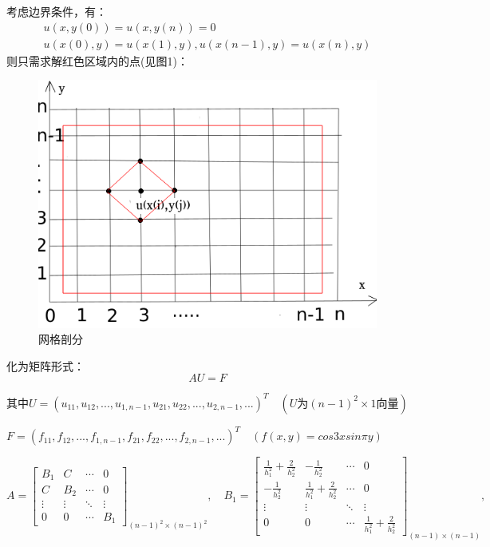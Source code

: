 \documentclass[12pt,a4paper]{article}
\begin{document}
考虑边界条件，有：
\begin{equation}
\begin{array}{l}{u(x,y(0)) = u(x,y(n))=0}\\
{u(x(0),y) = u(x(1),y),u(x(n-1),y) = u(x(n),y)}\end{array}
\end{equation}
\newpage 
则只需求解红色区域内的点(见图1)：
\begin{figure}[ht]
	\centering
	\includegraphics[scale=0.4]{./figures/zuobiao.png}
	\caption{网格剖分}
	\label{fig:label}	
\end{figure}



化为矩阵形式：
$$AU = F$$

其中$U = (u_{11},u_{12},...,u_{1,n-1},u_{21},u_{22},...,u_{2,n-1},...)^{T} \quad (U\text{为}(n-1)^2 \times 1 \text{向量})$

$F = (f_{11},f_{12},...,f_{1,n-1},f_{21},f_{22},...,f_{2,n-1},...)^{T} \quad (f(x,y)=cos{3x}sin{\pi y})$

\begin{equation}
A = \left[                 
\begin{array}{cccc}
B_1& C &\cdots  & 0\\
C& B_2 &\cdots& 0\\
\vdots  & \vdots & \ddots & \vdots \\
0& 0 &\cdots  &B_1
\end{array}
\right ]_{(n-1)^2 \times (n-1)^2},\quad B_1 = \left[                 
\begin{array}{cccc}
\frac{1}{h_1^2}+\frac{2}{h_2^2}& -\frac{1}{h_2^2} &\cdots  & 0\\
-\frac{1}{h_2^2}& \frac{1}{h_1^2}+\frac{2}{h_2^2} &\cdots& 0\\
\vdots  & \vdots & \ddots & \vdots \\
0& 0 &\cdots  &\frac{1}{h_1^2}+\frac{2}{h_2^2}
\end{array}
\right ]_{(n-1) \times (n-1)} ,
\end{equation}
\end{document}
